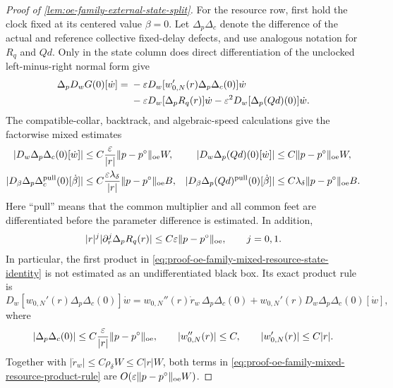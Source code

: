 \begin{proof}[Proof of
\cref{lem:oe-family-external-state-split}]
For the resource row, first hold the clock fixed at its centered value
\(\beta=0\).  Let \(\Delta_p\Delta_c\) denote the difference of the
actual and reference collective fixed-delay defects, and use analogous
notation for \(R_q\) and \(Qd\).  Only in the state column does direct
differentiation of the unclocked left-minus-right normal form give
\begin{align}
 \Delta_pD_wG(0)[\dot w]
 ={}&-\varepsilon D_w
    [w_{0,N}'(r)\Delta_p\Delta_c(0)]\dot w\notag\\
 &-\varepsilon D_w[\Delta_pR_q(r)]\dot w
   -\varepsilon^2D_w[\Delta_p(Qd)(0)]\dot w .
                                                        \label{eq:proof-oe-family-mixed-resource-state-identity}
\end{align}
The compatible-collar, backtrack, and algebraic-speed calculations give
the factorwise mixed estimates
\begin{align}
 |D_w\Delta_p\Delta_c(0)[\dot w]|
 &\le C\frac{\varepsilon}{|r|}
       \|p-p^\circ\|_{\rm oe}W,&
 |D_w\Delta_p(Qd)(0)[\dot w]|
 &\le C\|p-p^\circ\|_{\rm oe}W,\notag\\
 |D_\beta\Delta_p\Delta_c^{\rm pull}(0)[\dot\beta]|
 &\le C\frac{\varepsilon\lambda_\delta}{|r|}
       \|p-p^\circ\|_{\rm oe}B,&
 |D_\beta\Delta_p(Qd)^{\rm pull}(0)[\dot\beta]|
 &\le C\lambda_\delta
       \|p-p^\circ\|_{\rm oe}B.                \label{eq:proof-oe-family-mixed-resource-factors}
\end{align}
Here ``pull'' means that the common multiplier and all common feet are
differentiated before the parameter difference is estimated.  In
addition,
\begin{equation}
 |r|^j|\partial_r^j\Delta_pR_q(r)|
 \le C\varepsilon\|p-p^\circ\|_{\rm oe},
 \qquad j=0,1.                                  \label{eq:proof-oe-family-mixed-Rq}
\end{equation}
In particular, the first product in
\cref{eq:proof-oe-family-mixed-resource-state-identity} is not estimated
as an undifferentiated black box.  Its exact product rule is
\begin{equation}
 D_w[w_{0,N}'(r)\Delta_p\Delta_c(0)]\dot w
 =w_{0,N}''(r)\dot r_w\,\Delta_p\Delta_c(0)
   +w_{0,N}'(r)D_w\Delta_p\Delta_c(0)[\dot w],   \label{eq:proof-oe-family-mixed-resource-product-rule}
\end{equation}
where
\[
 |\Delta_p\Delta_c(0)|
 \le C\frac{\varepsilon}{|r|}
       \|p-p^\circ\|_{\rm oe},\qquad
 |w_{0,N}''(r)|\le C,\qquad
 |w_{0,N}'(r)|\le C|r|.
\]
Together with \(|\dot r_w|\le C\rho_\delta W\le C|r|W\), both
terms in \cref{eq:proof-oe-family-mixed-resource-product-rule} are
\(O(\varepsilon\|p-p^\circ\|_{\rm oe}W)\).


\end{proof}
